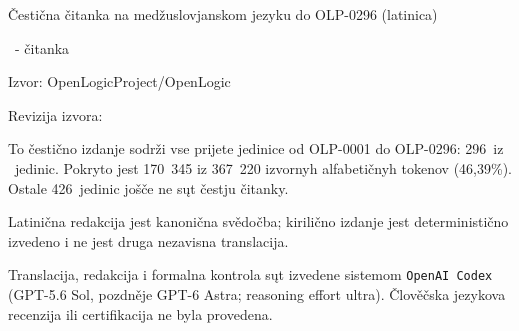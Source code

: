 \documentclass[openany]{memoir}
\title{\OLCompleteEditionTitle}
\author{Open Logic Project}
\date{Kontrolny punkt 24. oktobra 2026}
\renewcommand*{\OLCanonicalReaderCount}{296}
\newcommand*{\OLPendingReaderCount}{426}
\providecommand*{\OLReaderLayoutLabel}{čitanka}
\providecommand*{\OLCompleteEditionTitle}{Čestična čitanka na medžuslovjanskom jezyku do OLP-0296 (latinica)}
\begin{document}
\begin{titlingpage}
\begin{center}
\vspace*{1.5cm}
{\HUGE\bfseries\sffamily \OLTname\par}
\vspace{0.8cm}
{\huge \OLCompleteEditionTitle\par}
\vspace{0.8cm}
{\Large \OLLocaleBCPTag\ - \OLReaderLayoutLabel\par}
\vspace{1cm}
{\large Izvor: OpenLogicProject/OpenLogic\par}
{\large Revizija izvora: \texttt{\OLSourceCommit}\par}
\end{center}

\vfill

\noindent
To čestično izdanje sodrži vse prijete jedinice od OLP-0001 do
OLP-0296: \OLCanonicalReaderCount\ iz \OLSourceClosureCount\ jedinic.
Pokryto jest 170~345 iz 367~220 izvornyh alfabetičnyh tokenov (46,39\%).
Ostale \OLPendingReaderCount\ jedinic jošče ne sųt čestju čitanky.

\medskip
Latinična redakcija jest kanonična svědočba; kirilično izdanje jest
deterministično izvedeno i ne jest druga nezavisna translacija.

\medskip
Translacija, redakcija i formalna kontrola sųt izvedene sistemom
\texttt{OpenAI Codex} (GPT-5.6 Sol, pozdněje GPT-6 Astra; reasoning effort ultra). Člověčska jezykova
recenzija ili certifikacija ne byla provedena.

\medskip
\ollicense
\end{titlingpage}

\pagestyle{plain}

\tableofcontents*

\photocredits
\nocite{Frege1953,Peter1967}


\end{document}
